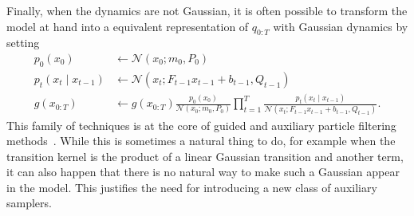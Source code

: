 Finally, when the dynamics are not Gaussian, it is often possible to transform the model at hand into a equivalent representation of $q_{0:T}$ with Gaussian dynamics by setting
\begin{equation}
    \begin{split}
        p_0(x_0)                &\leftarrow \mathcal{N}(x_0; m_0, P_0) \\
        p_t(x_t \mid x_{t-1})   &\leftarrow \mathcal{N}(x_t ; F_{t-1}x_{t-1} + b_{t-1}, Q_{t-1}) \\
        g(x_{0:T})              &\leftarrow g(x_{0:T}) \frac{p_0(x_0)}{\mathcal{N}(x_0; m_0, P_0)} \prod_{t=1}^T \frac{p_t(x_t \mid x_{t-1})}{\mathcal{N}(x_t ; F_{t-1}x_{t-1} + b_{t-1}, Q_{t-1})}.
    \end{split}
\end{equation}
This family of techniques is at the core of guided and auxiliary particle filtering methods~\citep[see, e.g.,][Ch. 10]{Chopin2020book}. While this is sometimes a natural thing to do, for example when the transition kernel is the product of a linear Gaussian transition and another term, it can also happen that there is no natural way to make such a Gaussian appear in the model. This justifies the need for introducing a new class of auxiliary samplers.
